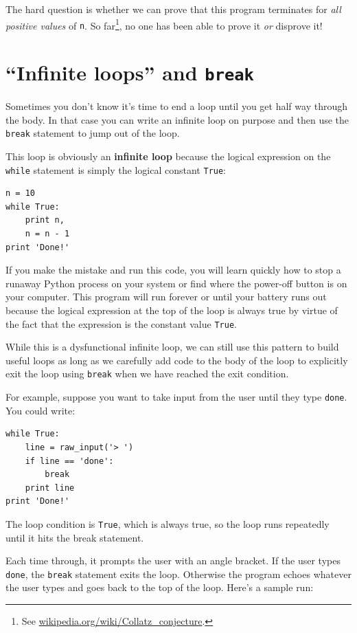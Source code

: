 \documentclass[10pt]{book}
\begin{document}
The hard question is whether we can prove that this program terminates
for {\em all positive values} of {\tt n}.  So far\footnote{See
  \url{wikipedia.org/wiki/Collatz_conjecture}.}, no one has
been able to prove it {\em or} disprove it!

\section{``Infinite loops'' and {\tt break}}

Sometimes you don't know it's time to end a loop until you get half
way through the body.  In that case you can write an infinite loop on purpose
and then use the {\tt break} statement to jump out of the loop.

This loop is obviously an {\bf infinite loop} because the logical 
expression on the
{\tt while} statement is simply the logical constant {\tt True}:
\beforeverb
\begin{verbatim}
n = 10
while True:
    print n, 
    n = n - 1
print 'Done!'
\end{verbatim}
\afterverb
%
If you make the mistake and run this code, you will learn quickly how
to stop a runaway Python process on your system or find where the power-off
button is on your computer.  
This program will 
run forever or until your battery runs out 
because the logical expression at the top of the loop 
is always true by virtue of the fact that the expression is the 
constant value {\tt True}.

While this is a dysfunctional infinite loop, we can still use this pattern
to build useful loops as long as we carefully add code to the 
body of the loop to explicitly exit the loop using {\tt break} 
when we have reached 
the exit condition.

For example, suppose you want to take input from the user until they
type {\tt done}.  You could write:

\beforeverb
\begin{verbatim}
while True:
    line = raw_input('> ')
    if line == 'done':
        break
    print line
print 'Done!'
\end{verbatim}
\afterverb
%
The loop condition is {\tt True}, which is always true, so the
loop runs repeatedly until it hits the break statement.

Each time through, it prompts the user with an angle bracket.
If the user types {\tt done}, the {\tt break} statement exits
the loop.  Otherwise the program echoes whatever the user types
and goes back to the top of the loop.  Here's a sample run:
\end{document}
